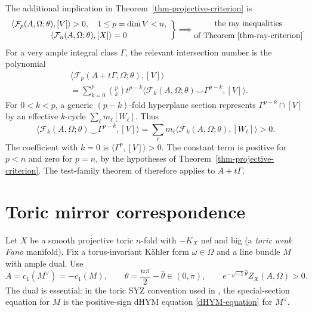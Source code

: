 \documentclass[12pt,reqno]{amsart}
\numberwithin{equation}{section}
\theoremstyle{plain}
\theoremstyle{definition}
\newcommand{\cF}{\mathcal F}
\begin{document}
The additional implication in Theorem~\ref{thm-projective-criterion} is
\[
 \left.
 \begin{array}{c}
  \langle\cF_p(A,\Omega;\theta),[V]\rangle>0,
  \quad 1\leq p=\dim V<n,\\[2pt]
  \langle\cF_n(A,\Omega;\theta),[X]\rangle=0
 \end{array}
 \right\}
 \Longrightarrow
 \begin{gathered}\text{the ray inequalities}\\\text{of Theorem~\ref{thm-ray-criterion}}\end{gathered}.
\]
For a very ample integral class $\Gamma$, the relevant intersection
number is the polynomial
\begin{align}
 &\big\langle\cF_p(A+t\Gamma,\Omega;\theta),[V]\big\rangle\nonumber\\
 &=\sum_{k=0}^p\binom pk t^{p-k}
 \big\langle\cF_k(A,\Omega;\theta)\smile\Gamma^{p-k},[V]\big\rangle.
 \label{hyperplane-section-expansion}
\end{align}
For $0<k<p$, a generic $(p-k)$-fold hyperplane section represents
$\Gamma^{p-k}\cap[V]$ by an effective $k$-cycle
$\sum_\ell m_\ell[W_\ell]$. Thus
\[
 \big\langle\cF_k(A,\Omega;\theta)\smile\Gamma^{p-k},[V]\big\rangle
 =\sum_\ell m_\ell\langle\cF_k(A,\Omega;\theta),[W_\ell]\rangle>0.
\]
The coefficient with $k=0$ is $\langle\Gamma^p,[V]\rangle>0$.
The constant term is positive for $p<n$ and zero for $p=n$, by the
hypotheses of Theorem~\ref{thm-projective-criterion}.
The test-family theorem of \cite{CLT24} therefore applies to
$A+t\Gamma$.

\section{Toric mirror correspondence}\label{toric-mirror-correspondence}
Let $X$ be a smooth projective toric $n$-fold with $-K_X$ nef and big
(a \emph{toric weak Fano} manifold). Fix a torus-invariant K\"ahler
form $\omega\in\Omega$ and a line bundle $M$ with ample dual. Use
\[
 A=c_1(M^\vee)=-c_1(M),\qquad
 \theta=\frac{n\pi}{2}-\widehat\theta\in(0,\pi),\qquad
 e^{-\sqrt{-1}\widehat\theta}Z_X(A,\Omega)>0.
\]
The dual is essential: in the toric SYZ convention used in
\cite[Remark 2.1]{Sto25}, the special-section equation for $M$ is the
positive-sign dHYM equation \eqref{dHYM-equation} for $M^\vee$.
\end{document}
